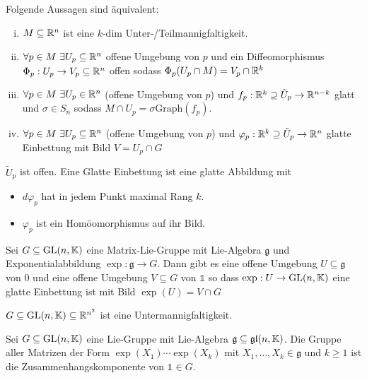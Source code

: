 \begin{definition}
    Folgende Aussagen sind äquivalent:
    \begin{enumerate}[(i)]
        \item $M \subseteq \mathbb{R}^n$ ist eine $k$-dim Unter-/Teilmannigfaltigkeit.
        \item $\forall p \in M \ \exists U_p \subseteq \mathbb{R}^n$ offene Umgebung von $p$
            und ein Diffeomorphismus $\Phi_p : U_p \rightarrow V_p \subseteq \mathbb{R}^n$ offen
            sodass $\Phi_p (U_p \cap M) = V_p \cap \mathbb{R}^k$
        \item $\forall p \in M \ \exists U_p \in \mathbb{R}^n$ (offene Umgebung von $p$)
            und $f_p : \mathbb{R}^k \supseteq \tilde{U}_p \rightarrow \mathbb{R}^{n-k}$ glatt und
            $\sigma \in S_n$ sodass $M \cap U_p = \sigma \text{Graph}(f_p)$.
        \item $\forall p \in M \ \exists U_p \subseteq \mathbb{R}^n$ (offene Umgebung von $p$)
            und $\varphi_p : \mathbb{R}^k \supseteq \tilde{U}_p \rightarrow \mathbb{R}^n$ glatte
            Einbettung mit Bild $V = U_p \cap G$
    \end{enumerate}
    $\tilde{U}_p$ ist offen.
    Eine Glatte Einbettung ist eine glatte Abbildung mit
    \begin{itemize}
        \item $d \varphi_p$ hat in jedem Punkt maximal Rang $k$.
        \item $\varphi_p$ ist ein Homöomorphismus auf ihr Bild.
    \end{itemize}
\end{definition}

\begin{satz}
    Sei $G \subseteq \text{GL}(n,\mathbb{K})$ eine Matrix-Lie-Gruppe mit Lie-Algebra
    $\mathfrak{g}$ und Exponentialabbildung $\exp: \mathfrak{g} \rightarrow G$.
    Dann gibt es eine offene Umgebung $U \subseteq \mathfrak{g}$ von $0$ und
    eine offene Umgebung $V \subseteq G$ von $\mathds{1}$ so dass
    $\exp: U \rightarrow \text{GL}(n,\mathbb{K})$ eine glatte Einbettung ist mit Bild
    $\exp(U) = V \cap G$ 
\end{satz}

\begin{satz}
    $G \subseteq \text{GL}(n,\mathbb{K}) \subseteq \mathbb{R}^{n^2}$ ist eine Untermannigfaltigkeit.
\end{satz}

\begin{satz}
    Sei $G \subseteq \text{GL}(n,\mathbb{K})$ eine Lie-Gruppe mit Lie-Algebra $\mathfrak{g}
    \subseteq \mathfrak{gl}(n,\mathbb{K})$. Die Gruppe aller Matrizen der Form
    $\exp(X_1) \dotsb \exp(X_k)$ mit $X_1,\dots,X_k \in \mathfrak{g}$ und
    $k \geq 1$ ist die Zusammenhangskomponente von $\mathds{1} \in G$.
\end{satz}


